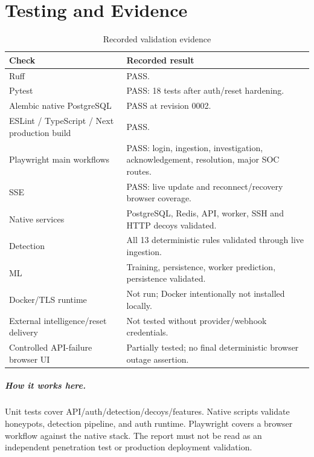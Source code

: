 \documentclass[11pt,oneside]{book}
\newcommand{\how}[1]{\paragraph{How it works here.}#1}
\begin{document}
\chapter{Testing and Evidence}
\begin{table}[h]\centering\caption{Recorded validation evidence}\begin{tabularx}{\linewidth}{lX}\toprule Check & Recorded result\\\midrule
Ruff & PASS.\\
Pytest & PASS: 18 tests after auth/reset hardening.\\
Alembic native PostgreSQL & PASS at revision 0002.\\
ESLint / TypeScript / Next production build & PASS.\\
Playwright main workflows & PASS: login, ingestion, investigation, acknowledgement, resolution, major SOC routes.\\
SSE & PASS: live update and reconnect/recovery browser coverage.\\
Native services & PostgreSQL, Redis, API, worker, SSH and HTTP decoys validated.\\
Detection & All 13 deterministic rules validated through live ingestion.\\
ML & Training, persistence, worker prediction, persistence validated.\\
Docker/TLS runtime & Not run; Docker intentionally not installed locally.\\
External intelligence/reset delivery & Not tested without provider/webhook credentials.\\
Controlled API-failure browser UI & Partially tested; no final deterministic browser outage assertion.\\\bottomrule\end{tabularx}\end{table}
\how{Unit tests cover API/auth/detection/decoys/features. Native scripts validate honeypots, detection pipeline, and auth runtime. Playwright covers a browser workflow against the native stack. The report must not be read as an independent penetration test or production deployment validation.}
\end{document}
